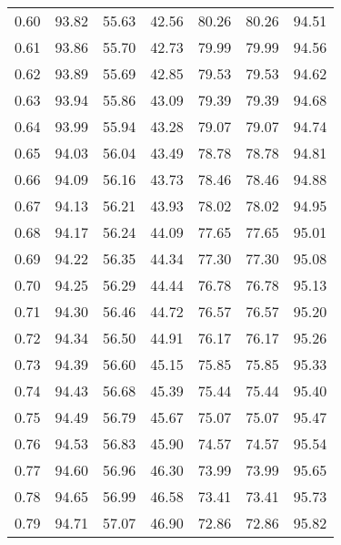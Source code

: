 \begin{tabular}{|c|c|c|c|c|c|c|}
      0.60 &     93.82 &     55.63 &      42.56 &   80.26 &      80.26 &         94.51 \\
      0.61 &     93.86 &     55.70 &      42.73 &   79.99 &      79.99 &         94.56 \\
      0.62 &     93.89 &     55.69 &      42.85 &   79.53 &      79.53 &         94.62 \\
      0.63 &     93.94 &     55.86 &      43.09 &   79.39 &      79.39 &         94.68 \\
      0.64 &     93.99 &     55.94 &      43.28 &   79.07 &      79.07 &         94.74 \\
      0.65 &     94.03 &     56.04 &      43.49 &   78.78 &      78.78 &         94.81 \\
      0.66 &     94.09 &     56.16 &      43.73 &   78.46 &      78.46 &         94.88 \\
      0.67 &     94.13 &     56.21 &      43.93 &   78.02 &      78.02 &         94.95 \\
      0.68 &     94.17 &     56.24 &      44.09 &   77.65 &      77.65 &         95.01 \\
      0.69 &     94.22 &     56.35 &      44.34 &   77.30 &      77.30 &         95.08 \\
      0.70 &     94.25 &     56.29 &      44.44 &   76.78 &      76.78 &         95.13 \\
      0.71 &     94.30 &     56.46 &      44.72 &   76.57 &      76.57 &         95.20 \\
      0.72 &     94.34 &     56.50 &      44.91 &   76.17 &      76.17 &         95.26 \\
      0.73 &     94.39 &     56.60 &      45.15 &   75.85 &      75.85 &         95.33 \\
      0.74 &     94.43 &     56.68 &      45.39 &   75.44 &      75.44 &         95.40 \\
      0.75 &     94.49 &     56.79 &      45.67 &   75.07 &      75.07 &         95.47 \\
      0.76 &     94.53 &     56.83 &      45.90 &   74.57 &      74.57 &         95.54 \\
      0.77 &     94.60 &     56.96 &      46.30 &   73.99 &      73.99 &         95.65 \\
      0.78 &     94.65 &     56.99 &      46.58 &   73.41 &      73.41 &         95.73 \\
      0.79 &     94.71 &     57.07 &      46.90 &   72.86 &      72.86 &         95.82 \\

\end{tabular}

